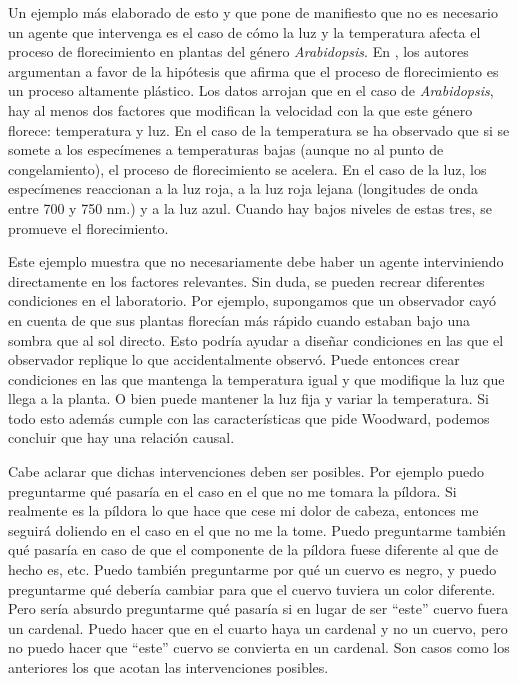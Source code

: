 {Un ejemplo más elaborado de esto y que pone de manifiesto que no es necesario un agente que intervenga es el caso de cómo la luz y la temperatura afecta el proceso de florecimiento en plantas del género \emph{Arabidopsis}. En \cite{AusinEnviro}, los autores argumentan a favor de la hipótesis que afirma que el proceso de florecimiento es un proceso altamente plástico. Los datos arrojan que en el caso de \emph{Arabidopsis}, hay al menos dos factores que modifican la velocidad con la que este género florece: temperatura y luz. En el caso de la temperatura se ha observado que si se somete a los especímenes a temperaturas bajas (aunque no al punto de congelamiento), el proceso de florecimiento se acelera. En el caso de la luz, los especímenes reaccionan a la luz roja, a la luz roja lejana (longitudes de onda entre 700 y 750 nm.) y a la luz azul. Cuando hay bajos niveles de estas tres, se promueve el florecimiento.

Este ejemplo muestra que no necesariamente debe haber un agente interviniendo directamente en los factores relevantes. Sin duda, se pueden recrear diferentes condiciones en el laboratorio. Por ejemplo, supongamos que un observador cayó en cuenta de que sus plantas florecían más rápido cuando estaban bajo una sombra que al sol directo. Esto podría ayudar a diseñar condiciones en las que el observador replique lo que accidentalmente observó. Puede entonces crear condiciones en las que mantenga la temperatura igual y que modifique la luz que llega a la planta. O bien puede mantener la luz fija y variar la temperatura. Si todo esto además cumple con las características que pide Woodward, podemos concluir que hay una relación causal.

Cabe aclarar que dichas intervenciones deben ser posibles. Por ejemplo puedo preguntarme qué pasaría en el caso en el que no me tomara la píldora. Si realmente es la píldora lo que hace que cese mi dolor de cabeza, entonces me seguirá doliendo en el caso en el que no me la tome. Puedo preguntarme también qué pasaría en caso de que el componente de la píldora fuese diferente al que de hecho es, etc. Puedo también preguntarme por qué un cuervo es negro, y puedo preguntarme qué debería cambiar para que el cuervo tuviera un color diferente. Pero sería absurdo preguntarme qué pasaría si en lugar de ser ``este'' cuervo fuera un cardenal. Puedo hacer que en el cuarto haya un cardenal y no un cuervo, pero no puedo hacer que ``este'' cuervo se convierta en un cardenal. Son casos como los anteriores los que acotan las intervenciones posibles.

}
